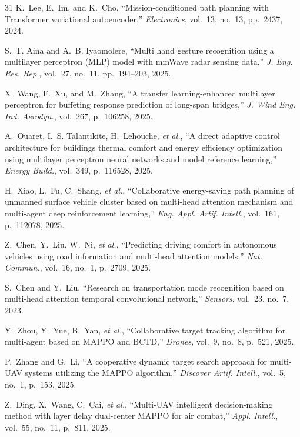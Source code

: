 \documentclass[sigconf]{acmart}
\newcommand{\etal}{\textit{et al.}}
\begin{document}
{\begin{thebibliography}{31}
K.~Lee, E.~Im, and K.~Cho,
``Mission-conditioned path planning with Transformer variational
autoencoder,''
\emph{Electronics}, vol.~13, no.~13, pp.~2437, 2024.

S.~T. Aina and A.~B. Iyaomolere,
``Multi hand gesture recognition using a multilayer perceptron
(MLP) model with mmWave radar sensing data,''
\emph{J. Eng. Res. Rep.}, vol.~27, no.~11, pp.~194--203, 2025.

X.~Wang, F.~Xu, and M.~Zhang,
``A transfer learning-enhanced multilayer perceptron for buffeting
response prediction of long-span bridges,''
\emph{J. Wind Eng. Ind. Aerodyn.}, vol.~267, p.~106258, 2025.

A.~Ouaret, I.~S. Talantikite, H.~Lehouche, \etal,
``A direct adaptive control architecture for buildings thermal
comfort and energy efficiency optimization using multilayer
perceptron neural networks and model reference learning,''
\emph{Energy Build.}, vol.~349, p.~116528, 2025.

H.~Xiao, L.~Fu, C.~Shang, \etal,
``Collaborative energy-saving path planning of unmanned surface
vehicle cluster based on multi-head attention mechanism and
multi-agent deep reinforcement learning,''
\emph{Eng. Appl. Artif. Intell.}, vol.~161, p.~112078, 2025.

Z.~Chen, Y.~Liu, W.~Ni, \etal,
``Predicting driving comfort in autonomous vehicles using road
information and multi-head attention models,''
\emph{Nat. Commun.}, vol.~16, no.~1, p.~2709, 2025.

S.~Chen and Y.~Liu,
``Research on transportation mode recognition based on multi-head
attention temporal convolutional network,''
\emph{Sensors}, vol.~23, no.~7, 2023.

Y.~Zhou, Y.~Yue, B.~Yan, \etal,
``Collaborative target tracking algorithm for multi-agent based
on MAPPO and BCTD,''
\emph{Drones}, vol.~9, no.~8, p.~521, 2025.

P.~Zhang and G.~Li,
``A cooperative dynamic target search approach for multi-UAV
systems utilizing the MAPPO algorithm,''
\emph{Discover Artif. Intell.}, vol.~5, no.~1, p.~153, 2025.

Z.~Ding, X.~Wang, C.~Cai, \etal,
``Multi-UAV intelligent decision-making method with layer delay
dual-center MAPPO for air combat,''
\emph{Appl. Intell.}, vol.~55, no.~11, p.~811, 2025.

\end{thebibliography}
}
\end{document}
